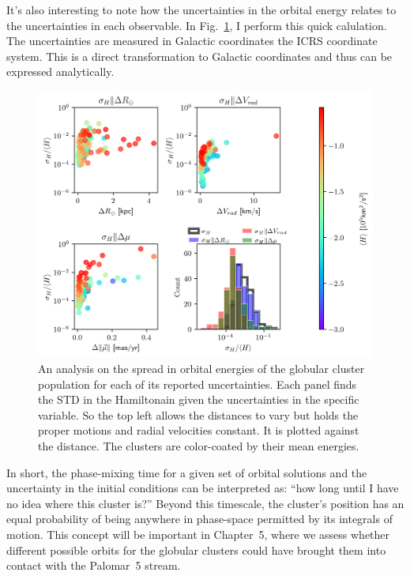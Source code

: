             It's also interesting to note how the uncertainties in the orbital energy relates to the uncertainties in each observable. In Fig.~\ref{fig:energy_sensitivity_analysis_MWGCS_to_distance_RV_mu}, I perform this quick calulation. The uncertainties are measured in Galactic coordinates the ICRS coordinate system. This is a direct transformation to Galactic coordinates and thus can be expressed analytically.

            \begin{figure}[p]
                \includegraphics[width=\linewidth]{images/energy_sensitivity_analysis_MWGCS_to_errors.png}
                \caption{An analysis on the spread in orbital energies of the globular cluster population for each of its reported uncertainties. Each panel finds the STD in the Hamiltonain given the uncertainties in the specific variable. So the top left allows the distances to vary but holds the proper motions and radial velocities constant. It is plotted against the distance. The clusters are color-coated by their mean energies.}
                \label{fig:energy_sensitivity_analysis_MWGCS_to_distance_RV_mu}
            \end{figure}

            In short, the phase-mixing time for a given set of orbital solutions and the uncertainty in the initial conditions can be interpreted as: ``how long until I have no idea where this cluster is?'' Beyond this timescale, the cluster's position has an equal probability of being anywhere in phase-space permitted by its integrals of motion. This concept will be important in Chapter~5, where we assess whether different possible orbits for the globular clusters could have brought them into contact with the Palomar~5 stream.


